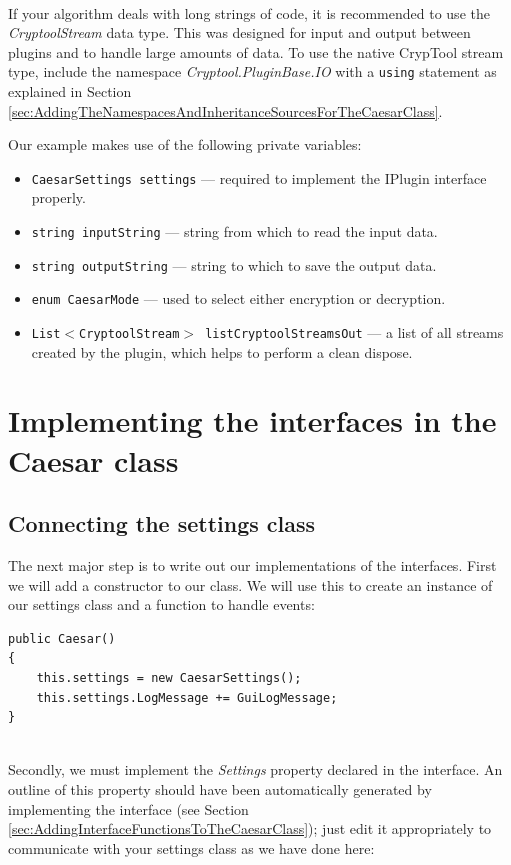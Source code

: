 \ \\ %
If your algorithm deals with long strings of code, it is recommended to use the \textit{CryptoolStream} data type. This was designed for input and output between plugins and to handle large amounts of data. To use the native CrypTool stream type, include the namespace \textit{Cryptool.PluginBase.IO} with a \texttt{using} statement as explained in Section \ref{sec:AddingTheNamespacesAndInheritanceSourcesForTheCaesarClass}.

Our example makes use of the following private variables:

\begin{itemize}
	\item \texttt{CaesarSettings settings} --- required to implement the IPlugin interface properly.
	\item \texttt{string inputString} --- string from which to read the input data.
	\item \texttt{string outputString} --- string to which to save the output data.
	\item \texttt{enum CaesarMode} --- used to select either encryption or decryption.
	\item \texttt{List$<$CryptoolStream$>$ listCryptoolStreamsOut} --- a list of all streams created by the plugin, which helps to perform a clean dispose.
\end{itemize}

\section{Implementing the interfaces in the Caesar class}
\label{sec:ImplementingTheInterfacesInTheCaesarClass}

\subsection{Connecting the settings class}
\label{sec:ConnectingTheSettingsClass}

The next major step is to write out our implementations of the interfaces. First we will add a constructor to our class. We will use this to create an instance of our settings class and a function to handle events:

\begin{lstlisting}
public Caesar()
{
	this.settings = new CaesarSettings();
	this.settings.LogMessage += GuiLogMessage;
}
\end{lstlisting}

\ \\
\indent Secondly, we must implement the \textit{Settings} property declared in the interface. An outline of this property should have been automatically generated by implementing the interface (see Section \ref{sec:AddingInterfaceFunctionsToTheCaesarClass}); just edit it appropriately to communicate with your settings class as we have done here:


